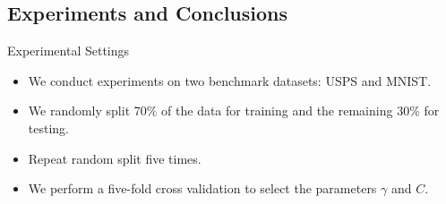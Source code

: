 \documentclass{beamer}
\begin{document}
\subsection{Experiments and Conclusions}
\begin{frame}{Experimental Settings}
\begin{itemize}
  \item We conduct experiments on two benchmark datasets: USPS and MNIST.
  \item We randomly split 70\% of the data for training and the remaining 30\% for testing.
  \item Repeat random split five times.
  \item We perform a five-fold cross validation to select the parameters $\gamma$ and $C$.
\end{itemize}
\begin{table}
\caption{Dataset descriptions (with the number $\ell$ of instances and the dimension $d$ of the data). The sizes for storing the data $\ell d$ and the associated kernel matrices $\ell^2$ are also listed.}
\label{tab:datasets}
\end{table}
\end{frame}
\end{document}
